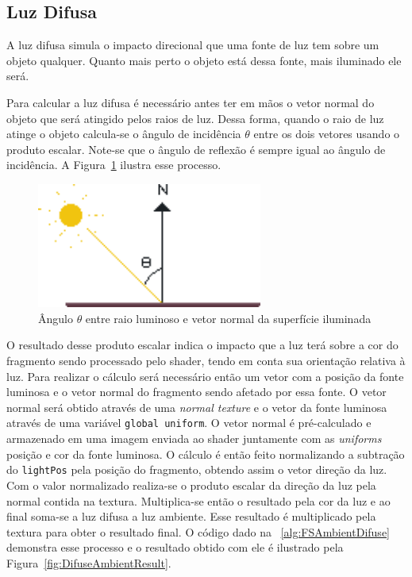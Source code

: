 \documentclass[12pt, 
openright, 
oneside, 
a4paper,    
brazil]{facom-ufu-abntex2}
\begin{document}
\subsection{Luz Difusa}
A luz difusa simula o impacto direcional que uma fonte de luz tem sobre um objeto qualquer. Quanto mais perto o objeto está dessa fonte, mais iluminado ele será.

Para calcular a luz difusa é necessário antes ter em mãos o vetor normal do objeto que será atingido pelos raios de luz. Dessa forma, quando o raio de luz atinge o objeto calcula-se o ângulo de incidência $\theta$ entre os dois vetores usando o produto escalar. Note-se que o ângulo de reflexão é sempre igual ao ângulo de incidência. A Figura~\ref{fig:DifuseLight} ilustra esse processo.

\begin{figure}[H]
	\centering
	\includegraphics[width=20em]{imagens/normal_reflection.png}
	\caption{Ângulo $\theta$ entre raio luminoso e vetor normal da superfície iluminada}
	\label{fig:DifuseLight}
\end{figure}

O resultado desse produto escalar indica o impacto que a luz terá sobre a cor do fragmento sendo processado pelo shader, tendo em conta sua orientação relativa à luz. Para realizar o cálculo será necessário  então um vetor com a posição da fonte luminosa e o vetor normal do fragmento sendo afetado por essa fonte.
O vetor normal será obtido através de uma \textit{normal texture} e o vetor da fonte luminosa através de uma variável \texttt{global uniform}. O vetor normal é pré-calculado e armazenado em uma imagem enviada ao shader juntamente com as \textit{uniforms} posição e cor da fonte luminosa. O cálculo é então feito normalizando a subtração do \texttt{lightPos} pela posição do fragmento, obtendo assim o vetor direção da luz. Com o valor normalizado realiza-se o produto escalar da direção da luz pela normal contida na textura. Multiplica-se então o resultado pela cor da luz e ao final soma-se a luz difusa a luz ambiente. Esse resultado é multiplicado pela textura para obter o resultado final. O código dado na \lstlistingname~\ref{alg:FSAmbientDifuse} demonstra esse processo e o resultado obtido com ele é ilustrado pela Figura~\ref{fig:DifuseAmbientResult}.
\end{document}
